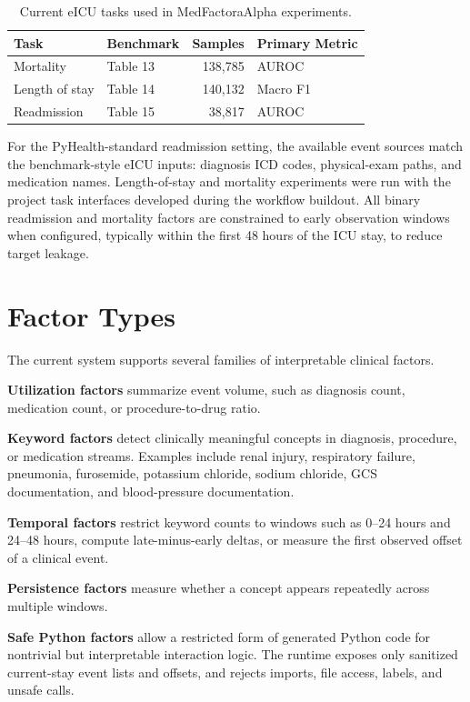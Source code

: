 \documentclass[letterpaper]{article}
\begin{document}
\begin{table}[t]
\centering
\small
\begin{tabular}{llrl}
\toprule
Task & Benchmark & Samples & Primary Metric\\
\midrule
Mortality & Table 13 & 138,785 & AUROC\\
Length of stay & Table 14 & 140,132 & Macro F1\\
Readmission & Table 15 & 38,817 & AUROC\\
\bottomrule
\end{tabular}
\caption{Current eICU tasks used in MedFactoraAlpha experiments.}
\label{tab:tasks}
\end{table}

For the PyHealth-standard readmission setting, the available event sources match the benchmark-style eICU inputs: diagnosis ICD codes, physical-exam paths, and medication names. Length-of-stay and mortality experiments were run with the project task interfaces developed during the workflow buildout. All binary readmission and mortality factors are constrained to early observation windows when configured, typically within the first 48 hours of the ICU stay, to reduce target leakage.

\section{Factor Types}

The current system supports several families of interpretable clinical factors.

\textbf{Utilization factors} summarize event volume, such as diagnosis count, medication count, or procedure-to-drug ratio.

\textbf{Keyword factors} detect clinically meaningful concepts in diagnosis, procedure, or medication streams. Examples include renal injury, respiratory failure, pneumonia, furosemide, potassium chloride, sodium chloride, GCS documentation, and blood-pressure documentation.

\textbf{Temporal factors} restrict keyword counts to windows such as 0--24 hours and 24--48 hours, compute late-minus-early deltas, or measure the first observed offset of a clinical event.

\textbf{Persistence factors} measure whether a concept appears repeatedly across multiple windows.

\textbf{Safe Python factors} allow a restricted form of generated Python code for nontrivial but interpretable interaction logic. The runtime exposes only sanitized current-stay event lists and offsets, and rejects imports, file access, labels, and unsafe calls.
\end{document}
